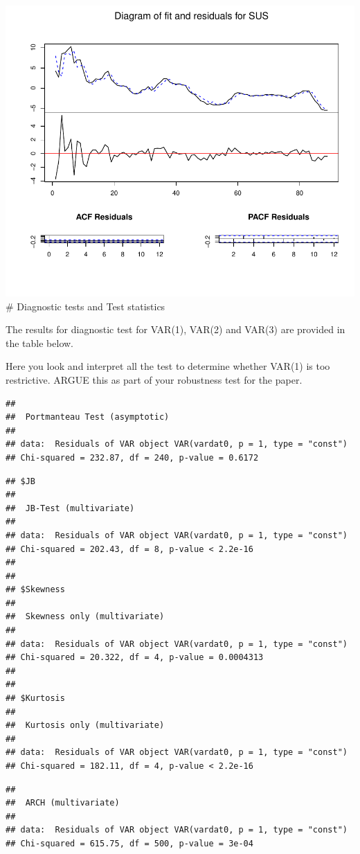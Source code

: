 \documentclass[11pt,preprint, authoryear]{elsarticle}
\numberwithin{equation}{section}
\numberwithin{figure}{section}
\numberwithin{table}{section}
\begin{document}
\includegraphics{replication_files/figure-latex/unnamed-chunk-5-4.pdf}
\# Diagnostic tests and Test statistics

The results for diagnostic test for VAR(1), VAR(2) and VAR(3) are
provided in the table below.

Here you look and interpret all the test to determine whether VAR(1) is
too restrictive. ARGUE this as part of your robustness test for the
paper.

\begin{verbatim}
## 
##  Portmanteau Test (asymptotic)
## 
## data:  Residuals of VAR object VAR(vardat0, p = 1, type = "const")
## Chi-squared = 232.87, df = 240, p-value = 0.6172
\end{verbatim}

\begin{verbatim}
## $JB
## 
##  JB-Test (multivariate)
## 
## data:  Residuals of VAR object VAR(vardat0, p = 1, type = "const")
## Chi-squared = 202.43, df = 8, p-value < 2.2e-16
## 
## 
## $Skewness
## 
##  Skewness only (multivariate)
## 
## data:  Residuals of VAR object VAR(vardat0, p = 1, type = "const")
## Chi-squared = 20.322, df = 4, p-value = 0.0004313
## 
## 
## $Kurtosis
## 
##  Kurtosis only (multivariate)
## 
## data:  Residuals of VAR object VAR(vardat0, p = 1, type = "const")
## Chi-squared = 182.11, df = 4, p-value < 2.2e-16
\end{verbatim}

\begin{verbatim}
## 
##  ARCH (multivariate)
## 
## data:  Residuals of VAR object VAR(vardat0, p = 1, type = "const")
## Chi-squared = 615.75, df = 500, p-value = 3e-04
\end{verbatim}
\end{document}
